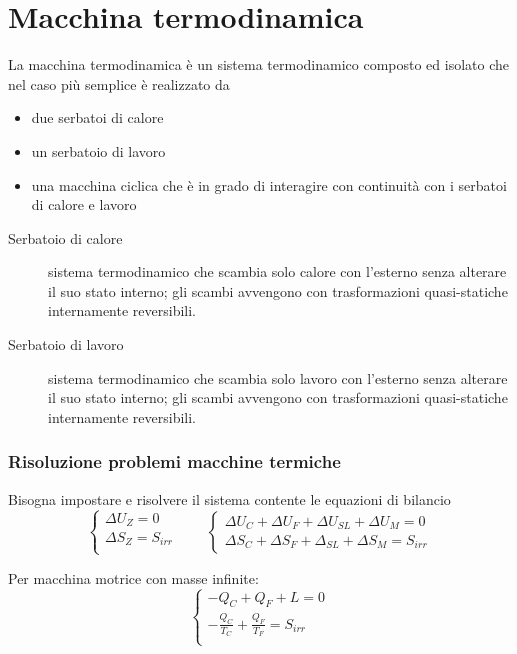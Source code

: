 \section{Macchina termodinamica}
La macchina termodinamica è un sistema termodinamico composto ed isolato che nel caso più semplice è realizzato da
\begin{itemize}
\item due serbatoi di calore
\item un serbatoio di lavoro
\item una macchina ciclica che è in grado di interagire con continuità con i serbatoi di calore e lavoro
\end{itemize}

\begin{description}
\item[Serbatoio di calore]
sistema termodinamico che scambia solo calore con l'esterno senza alterare il suo stato interno;
gli scambi avvengono con trasformazioni quasi-statiche internamente reversibili.
\item[Serbatoio di lavoro]
sistema termodinamico che scambia solo lavoro con l'esterno senza alterare il suo stato interno;
gli scambi avvengono con trasformazioni quasi-statiche internamente reversibili.
\end{description}

\subsubsection{Risoluzione problemi macchine termiche}
Bisogna impostare e risolvere il sistema contente le equazioni di bilancio
\[
    \begin{cases}
    \Delta U_Z = 0 \\
    \Delta S_Z = S_{irr} \\
    \end{cases} \qquad \begin{cases}
        \Delta U_C + \Delta U_F + \Delta U_{SL} + \Delta U_M = 0\\
        \Delta S_C + \Delta S_F + \Delta_{SL} + \Delta S_M = S_{irr}
    \end{cases}
\]

Per macchina motrice con masse infinite:
\[
    \begin{cases}
        -Q_C + Q_F + L = 0 \\
        -\frac{Q_C}{T_C} + \frac{Q_F}{T_F} = S_{irr} \\
    \end{cases}
\]

